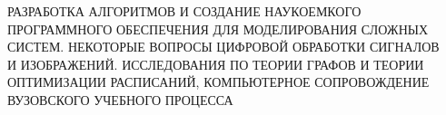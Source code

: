  \begin{center}
 {\large


 РАЗРАБОТКА АЛГОРИТМОВ И СОЗДАНИЕ НАУКОЕМКОГО \\[4pt]
 ПРОГРАММНОГО ОБЕСПЕЧЕНИЯ ДЛЯ МОДЕЛИРОВАНИЯ СЛОЖНЫХ\\[4pt] СИСТЕМ.
 НЕКОТОРЫЕ ВОПРОСЫ ЦИФРОВОЙ ОБРАБОТКИ СИГНАЛОВ\\[4pt] И ИЗОБРАЖЕНИЙ.
 ИССЛЕДОВАНИЯ ПО ТЕОРИИ ГРАФОВ И ТЕОРИИ \\[4pt] ОПТИМИЗАЦИИ РАСПИСАНИЙ,
 КОМПЬЮТЕРНОЕ СОПРОВОЖДЕНИЕ \\[4pt]
 ВУЗОВСКОГО УЧЕБНОГО ПРОЦЕССА
 }
 \\[12pt]
\end{center}
